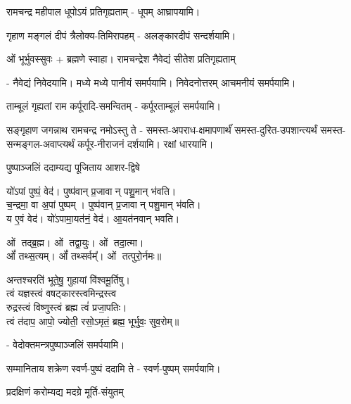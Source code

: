 \renewcommand{\devAya}{श्री-सीता-लक्ष्मण-भरत-शत्रुघ्न-हनुमत्-समेत-श्री-रामचन्द्र-परब्रह्मणे नमः}



{रामचन्द्र महीपाल धूपोऽयं प्रतिगृह्यताम्}
\namah - धूपम् आघ्रापयामि।

{गृहाण मङ्गलं दीपं त्रैलोक्य-तिमिरापहम्}
\namah - अलङ्कारदीपं सन्दर्शयामि।

ओं भूर्भुवस्सुवः + ब्रह्मणे स्वाहा।
{रामचन्द्रेश नैवेद्यं सीतेश प्रतिगृह्यताम्}

\namah - नैवेद्यं निवेदयामि। मध्ये मध्ये पानीयं समर्पयामि। निवेदनोत्तरम् आचमनीयं समर्पयामि।

{ताम्बूलं गृह्यतां राम कर्पूरादि-समन्वितम्}
\namah - कर्पूरताम्बूलं समर्पयामि।

{सङ्गृहाण जगन्नाथ रामचन्द्र नमोऽस्तु ते}
\namah - समस्त-अपराध-क्षमापणार्थंं समस्त-दुरित-उपशान्त्यर्थं समस्त-सन्मङ्गल-अवाप्त्यर्थं कर्पूर-नीराजनं दर्शयामि। रक्षां धारयामि।


{पुष्पाञ्जलिं ददाम्यद्य पूजिताय आशर-द्विषे}

यो॑ऽपां पुष्पं॒ वेद॑। पुष्प॑वान् प्र॒जावान् पशु॒मान् भ॑वति।\\
च॒न्द्रमा॒ वा अ॒पां पुष्पम्। पुष्प॑वान् प्र॒जावान् पशु॒मान् भ॑वति।\\
य ए॒वं वेद॑। यो॑ऽपामा॒यत॑नं॒ वेद॑। आ॒यत॑नवान् भवति।\medskip

ओं तद्ब्र॒ह्म। ओं तद्वा॒युः। ओं तदा॒त्मा।\\ ओं᳚ तथ्स॒त्यम्‌।
ओं᳚ तथ्सर्वम्᳚‌। ओं तत्पुरो॒र्नमः॥\medskip

अन्तश्चरति॑ भूते॒षु॒ गुहायां वि॑श्वमू॒र्तिषु। \\
त्वं यज्ञस्त्वं वषट्कारस्त्वमिन्द्रस्त्व\\ रुद्रस्त्वं विष्णुस्त्वं ब्रह्म त्वं॑ प्रजा॒पतिः। \\
त्वं त॑दाप॒ आपो॒ ज्योती॒ रसो॒ऽमृतं॒ ब्रह्म॒ भूर्भुवः॒ सुव॒रोम्‌॥

\namah - वेदोक्तमन्त्रपुष्पाञ्जलिं समर्पयामि।

{सम्मानिताय शक्रेण स्वर्ण-पुष्पं ददामि ते}
\namah - स्वर्ण-पुष्पम् समर्पयामि।

{प्रदक्षिणं करोम्यद्य मदग्रे मूर्ति-संयुतम्}

